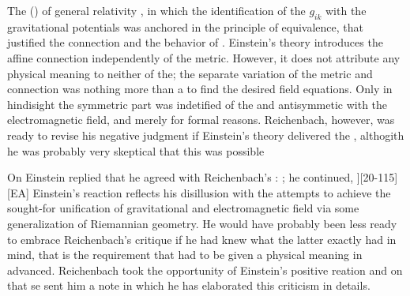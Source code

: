 \documentclass[draft]{article}
\begin{document}
The  () of general relativity \citep[367]{Reichenbach1921}, in which the identification of the $g_{ik}$ with the gravitational potentials was anchored in the principle of equivalence, that justified the connection and the behavior of \rac. Einstein's theory introduces the affine connection independently of the metric. However, it does not attribute any physical meaning to neither of the; the separate variation of the metric and connection was nothing more than a  to find the desired field equations. Only in hindisight the symmetric part was indetified of the \gmn and antisymmetic with the electromagnetic field, and merely for formal reasons. Reichenbach, however, was ready to revise his negative judgment if Einstein's theory delivered the , althogith he was probably very skeptical that this was possible \citep{Reichenbach1926}

On  Einstein replied that he agreed with Reichenbach's : ;  he continued,  ][20-115][EA] Einstein's reaction reflects his disillusion with the attempts to achieve the sought-for unification of gravitational and electromagnetic field via some generalization of Riemannian geometry. He would have probably been less ready to embrace Reichenbach's critique if he had knew what the latter exactly had in mind, that is the requirement that \Gtmn had to be given a physical meaning in advanced. Reichenbach took the opportunity of Einstein's positive reation and on  that se sent him a note in which he has elaborated this criticism in details.

\end{document}
